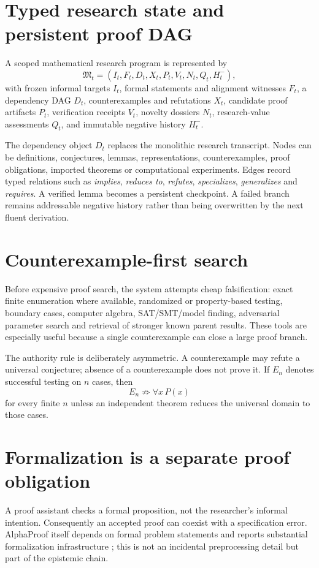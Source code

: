 \documentclass[11pt]{article}
\begin{document}
\section{Typed research state and persistent proof DAG}

A scoped mathematical research program is represented by
\[
\mathfrak M_t=(I_t,F_t,D_t,X_t,P_t,V_t,N_t,Q_t,H^-_t),
\]
with frozen informal targets $I_t$, formal statements and alignment witnesses $F_t$, a dependency DAG $D_t$, counterexamples and refutations $X_t$, candidate proof artifacts $P_t$, verification receipts $V_t$, novelty dossiers $N_t$, research-value assessments $Q_t$, and immutable negative history $H^-_t$.

The dependency object $D_t$ replaces the monolithic research transcript. Nodes can be definitions, conjectures, lemmas, representations, counterexamples, proof obligations, imported theorems or computational experiments. Edges record typed relations such as \emph{implies}, \emph{reduces to}, \emph{refutes}, \emph{specializes}, \emph{generalizes} and \emph{requires}. A verified lemma becomes a persistent checkpoint. A failed branch remains addressable negative history rather than being overwritten by the next fluent derivation.

\section{Counterexample-first search}

Before expensive proof search, the system attempts cheap falsification: exact finite enumeration where available, randomized or property-based testing, boundary cases, computer algebra, SAT/SMT/model finding, adversarial parameter search and retrieval of stronger known parent results. These tools are especially useful because a single counterexample can close a large proof branch.

The authority rule is deliberately asymmetric. A counterexample may refute a universal conjecture; absence of a counterexample does not prove it. If $E_n$ denotes successful testing on $n$ cases, then
\[
E_n\not\Rightarrow \forall x\,P(x)
\]
for every finite $n$ unless an independent theorem reduces the universal domain to those cases.

\section{Formalization is a separate proof obligation}

A proof assistant checks a formal proposition, not the researcher's informal intention. Consequently an accepted proof can coexist with a specification error. AlphaProof itself depends on formal problem statements and reports substantial formalization infrastructure \cite{hubert2025}; this is not an incidental preprocessing detail but part of the epistemic chain.
\end{document}
